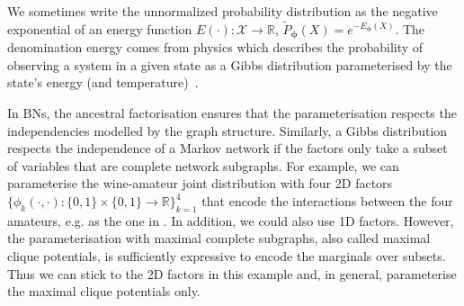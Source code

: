 We sometimes write the unnormalized probability distribution as the negative exponential of an energy function $E(\cdot): \mathcal{X} \rightarrow \mathbb{R}$, $\tilde{P}_{\bm{\phi}}(X) = e^{-E_{\bm{\phi}}(X)}$. The denomination energy comes from physics which describes the probability of observing a system in a given state as a Gibbs distribution parameterised by the state's energy (and temperature)~\citep{gibbs1902elementary}.

In BNs, the ancestral factorisation ensures that the parameterisation respects the independencies modelled by the graph structure. Similarly, a Gibbs distribution respects the independence of a Markov network if the factors only take a subset of variables that are complete network subgraphs. For example, we can parameterise the wine-amateur joint distribution with four 2D factors $\{\phi_k(\cdot,\cdot): \{ 0, 1\} \times \{ 0, 1\} \rightarrow \mathbb{R}\}_{k=1}^4$ that encode the interactions between the four amateurs, e.g. as the one in . In addition, we could also use 1D factors. However, the parameterisation with maximal complete subgraphs, also called maximal clique potentials, is sufficiently expressive to encode the marginals over subsets. Thus we can stick to the 2D factors in this example and, in general, parameterise the maximal clique potentials only.

